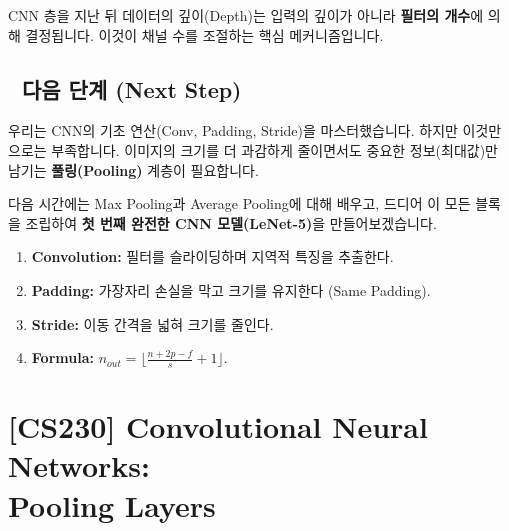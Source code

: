 \documentclass[11pt,a4paper]{book}
\theoremstyle{definition}
\begin{document}
\begin{warningbox}[title={필터 개수 = 출력 채널 수}]
CNN 층을 지난 뒤 데이터의 깊이(Depth)는 입력의 깊이가 아니라 \textbf{필터의 개수}에 의해 결정됩니다. 이것이 채널 수를 조절하는 핵심 메커니즘입니다.
\end{warningbox}

\section*{🔗 다음 단계 (Next Step)}
우리는 CNN의 기초 연산(Conv, Padding, Stride)을 마스터했습니다.
하지만 이것만으로는 부족합니다. 이미지의 크기를 더 과감하게 줄이면서도 중요한 정보(최대값)만 남기는 \textbf{풀링(Pooling)} 계층이 필요합니다.

다음 시간에는 Max Pooling과 Average Pooling에 대해 배우고, 드디어 이 모든 블록을 조립하여 \textbf{첫 번째 완전한 CNN 모델(LeNet-5)}을 만들어보겠습니다.

\vspace{0.5cm}

\begin{summarybox}[title={단원 요약 (Cheat Sheet)}]
\begin{enumerate}
    \item \textbf{Convolution:} 필터를 슬라이딩하며 지역적 특징을 추출한다.
    \item \textbf{Padding:} 가장자리 손실을 막고 크기를 유지한다 (Same Padding).
    \item \textbf{Stride:} 이동 간격을 넓혀 크기를 줄인다.
    \item \textbf{Formula:} $n_{out} = \lfloor \frac{n+2p-f}{s} + 1 \rfloor$.
\end{enumerate}
\end{summarybox}


\chapter{[CS230] Convolutional Neural Networks: \\ Pooling Layers}
\label{ch:lecture30}

\end{document}
